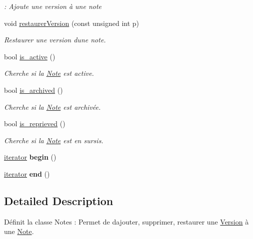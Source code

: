 \begin{DoxyCompactItemize}
\begin{DoxyCompactList}\small\item\em \+: Ajoute une version à une note \end{DoxyCompactList}\item 
void \hyperlink{class_note_a19cfb61168f8f6ce29cbdefd8448c0c0}{restaurer\+Version} (const unsigned int p)
\begin{DoxyCompactList}\small\item\em Restaurer une version d\textquotesingle{}une note. \end{DoxyCompactList}\item 
bool \hyperlink{class_note_aca74abbfeb1ff6bba66db5e81f5f622e}{is\+\_\+active} ()
\begin{DoxyCompactList}\small\item\em Cherche si la \hyperlink{class_note}{Note} est active. \end{DoxyCompactList}\item 
bool \hyperlink{class_note_a59f2e98d827736fefc03a71606db7e3d}{is\+\_\+archived} ()
\begin{DoxyCompactList}\small\item\em Cherche si la \hyperlink{class_note}{Note} est archivée. \end{DoxyCompactList}\item 
bool \hyperlink{class_note_a35ed46ae39aedc142d4fd9461a3d6a33}{is\+\_\+reprieved} ()
\begin{DoxyCompactList}\small\item\em Cherche si la \hyperlink{class_note}{Note} est en sursis. \end{DoxyCompactList}\item 
\mbox{\label{class_note_a6104d75b44e1c93b2b30b5359746b1db}} 
\hyperlink{class_note_1_1iterator}{iterator} {\bfseries begin} ()
\item 
\mbox{\label{class_note_a124c8d9a817ba9531c02750b7e56ad4c}} 
\hyperlink{class_note_1_1iterator}{iterator} {\bfseries end} ()
\end{DoxyCompactItemize}


\subsection{Detailed Description}
Définit la classe Notes \+: Permet de d\textquotesingle{}ajouter, supprimer, restaurer une \hyperlink{class_version}{Version} à une \hyperlink{class_note}{Note}. 

